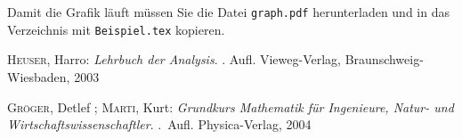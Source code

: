 \documentclass[12pt]{scrartcl}%
\theoremstyle{nonumberplain}
\begin{document}
Damit die Grafik läuft müssen Sie die Datei  \texttt{graph.pdf}
herunterladen und in das Verzeichnis mit \texttt{Beispiel.tex}
kopieren. 



\begin{thebibliography}{99}
 \textsc{Heuser}, Harro:
  \newblock \emph{Lehrbuch der Analysis}.
  . Aufl.
  \newblock Vieweg-Verlag, Braunschweig-Wiesbaden, 2003

\textsc{Gr{\"o}ger}, Detlef ; \textsc{Marti}, Kurt:
\newblock \emph{Grundkurs Mathematik für Ingenieure, Natur- und
  Wirtschaftswissenschaftler}.
.~Aufl.
\newblock Physica-Verlag, 2004
\end{thebibliography}
\end{document}
